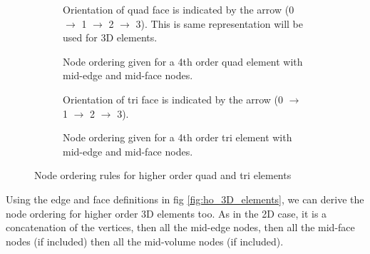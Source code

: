 {\begin{figure}[h!]
    \centering
    \begin{subfigure}[b]{0.45\textwidth}
        \centering
        
        \caption{Orientation of quad face is indicated by the arrow (0 $\rightarrow$ 1 $\rightarrow$ 2 $\rightarrow$ 3). This is same representation will be used for 3D elements.}
        \label{fig:ho_quad-arrow}
    \end{subfigure}
    \hfill
    \begin{subfigure}[b]{0.45\textwidth}
        \centering
        
        \caption{Node ordering given for a 4th order quad element with mid-edge and mid-face nodes.}
        \label{fig:ho_quad-numbered}
    \end{subfigure}
    \begin{subfigure}[b]{0.45\textwidth}
        \centering
        
        \caption{Orientation of tri face is indicated by the arrow (0 $\rightarrow$ 1 $\rightarrow$ 2 $\rightarrow$ 3).}
        \label{fig:ho_tri-arrow}
    \end{subfigure}
    \hfill
    \begin{subfigure}[b]{0.45\textwidth}
        \centering
        
        \caption{Node ordering given for a 4th order tri element with mid-edge and mid-face nodes.}
        \label{fig:ho_tri-numbered}
    \end{subfigure}
    \caption{Node ordering rules for higher order quad and tri elements}
    \label{fig:ho_2D_elements}
\end{figure}

Using the edge and face definitions in fig \ref{fig:ho_3D_elements},
we can derive the node ordering for higher order 3D elements too. As
in the 2D case, it is a concatenation of the vertices, then all the
mid-edge nodes, then all the mid-face nodes (if included) then all the
mid-volume nodes (if included).

}
